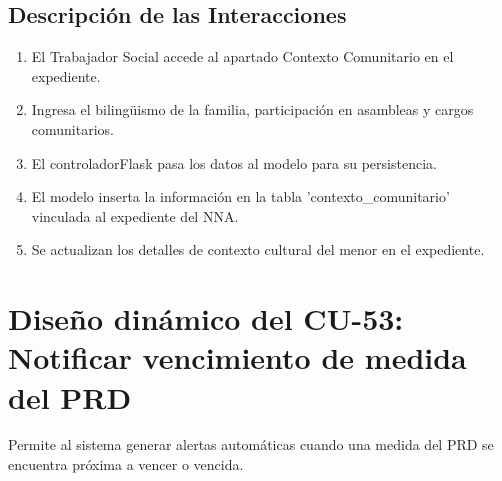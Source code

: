 \subsection{Descripción de las Interacciones}
\begin{enumerate}
    \item El Trabajador Social accede al apartado Contexto Comunitario en el expediente.
    \item Ingresa el bilingüismo de la familia, participación en asambleas y cargos comunitarios.
    \item El controladorFlask pasa los datos al modelo para su persistencia.
    \item El modelo inserta la información en la tabla 'contexto\_comunitario' vinculada al expediente del NNA.
    \item Se actualizan los detalles de contexto cultural del menor en el expediente.
\end{enumerate}

\cleardoublepage
\section{Diseño dinámico del CU-53: Notificar vencimiento de medida del PRD}
\label{sec:disenoDinamicoCU53}

Permite al sistema generar alertas automáticas cuando una medida del PRD se encuentra próxima a vencer o vencida.


